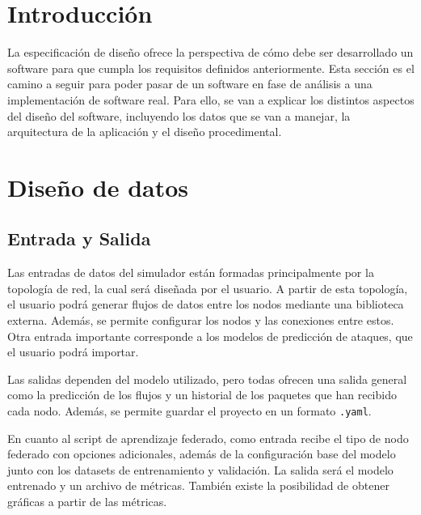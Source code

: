 
\section{Introducción}
\label{sec:DisenoIntroduccion}
La especificación de diseño ofrece la perspectiva de cómo debe ser desarrollado un software para que cumpla los requisitos definidos anteriormente. Esta sección es el camino a seguir para poder pasar de un software en fase de análisis a una implementación de software real. Para ello, se van a explicar los distintos aspectos del diseño del software, incluyendo los datos que se van a manejar, la arquitectura de la aplicación y el diseño procedimental.

\section{Diseño de datos}
\label{sec:DisenoDatos}
\subsection{Entrada y Salida}
\label{subsec:DatosEntradaSalida}
Las entradas de datos del simulador están formadas principalmente por la topología de red, la cual será diseñada por el usuario. A partir de esta topología, el usuario podrá generar flujos de datos entre los nodos mediante una biblioteca externa. Además, se permite configurar los nodos y las conexiones entre estos. Otra entrada importante corresponde a los modelos de predicción de ataques, que el usuario podrá importar.

Las salidas dependen del modelo utilizado, pero todas ofrecen una salida general como la predicción de los flujos y un historial de los paquetes que han recibido cada nodo. Además, se permite guardar el proyecto en un formato \texttt{.yaml}.

En cuanto al script de aprendizaje federado, como entrada recibe el tipo de nodo federado con opciones adicionales, además de la configuración base del modelo junto con los datasets de entrenamiento y validación. La salida será el modelo entrenado y un archivo de métricas. También existe la posibilidad de obtener gráficas a partir de las métricas. 

